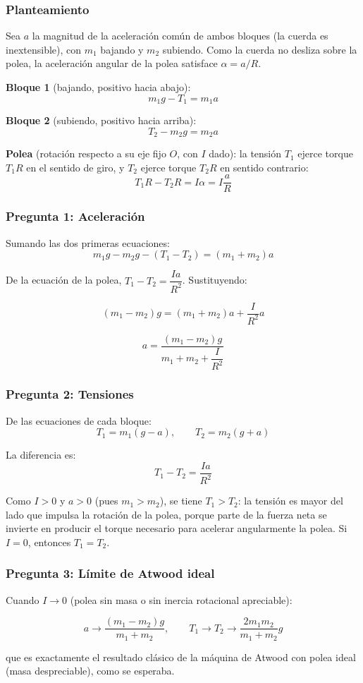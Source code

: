 \begin{sol}

\subsubsection*{Planteamiento}

Sea $a$ la magnitud de la aceleración común de ambos bloques (la cuerda es inextensible), con $m_1$ bajando y $m_2$ subiendo. Como la cuerda no desliza sobre la polea, la aceleración angular de la polea satisface $\alpha = a/R$.

\textbf{Bloque 1} (bajando, positivo hacia abajo):
$$m_1 g - T_1 = m_1 a$$

\textbf{Bloque 2} (subiendo, positivo hacia arriba):
$$T_2 - m_2 g = m_2 a$$

\textbf{Polea} (rotación respecto a su eje fijo $O$, con $I$ dado): la tensión $T_1$ ejerce torque $T_1 R$ en el sentido de giro, y $T_2$ ejerce torque $T_2 R$ en sentido contrario:
$$T_1 R - T_2 R = I\alpha = I\frac{a}{R}$$

\subsubsection*{Pregunta 1: Aceleración}

Sumando las dos primeras ecuaciones:
$$m_1 g - m_2 g - (T_1 - T_2) = (m_1+m_2)a$$

De la ecuación de la polea, $T_1 - T_2 = \dfrac{Ia}{R^2}$. Sustituyendo:

$$(m_1 - m_2)g = (m_1+m_2)a + \frac{I}{R^2}a$$

$$\boxed{a = \frac{(m_1-m_2)g}{m_1+m_2+\dfrac{I}{R^2}}}$$

\subsubsection*{Pregunta 2: Tensiones}

De las ecuaciones de cada bloque:
$$\boxed{T_1 = m_1(g-a)}, \qquad \boxed{T_2 = m_2(g+a)}$$

La diferencia es:
$$T_1 - T_2 = \frac{Ia}{R^2}$$

Como $I > 0$ y $a > 0$ (pues $m_1 > m_2$), se tiene $T_1 > T_2$: la tensión es mayor del lado que impulsa la rotación de la polea, porque parte de la fuerza neta se invierte en producir el torque necesario para acelerar angularmente la polea. Si $I = 0$, entonces $T_1 = T_2$.

\subsubsection*{Pregunta 3: Límite de Atwood ideal}

Cuando $I \to 0$ (polea sin masa o sin inercia rotacional apreciable):

$$a \to \frac{(m_1-m_2)g}{m_1+m_2}, \qquad T_1 \to T_2 \to \frac{2m_1m_2}{m_1+m_2}g$$

que es exactamente el resultado clásico de la máquina de Atwood con polea ideal (masa despreciable), como se esperaba.

\end{sol}
